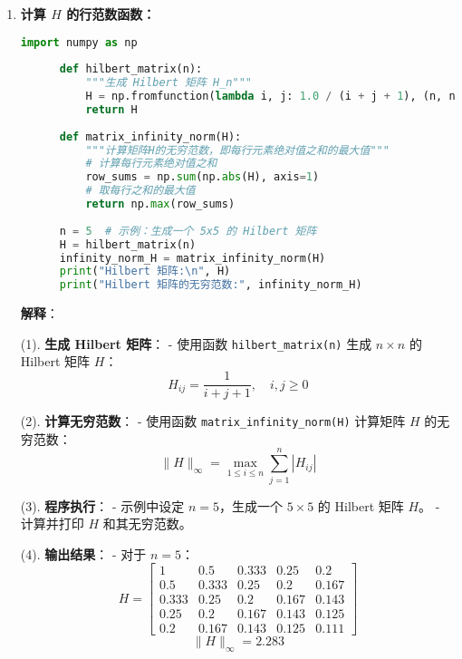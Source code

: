 \documentclass{article}
\begin{document}
\begin{enumerate}[itemsep=1em] %

      \item \textbf{计算 \( H \) 的行范数函数：}

            \begin{lstlisting}[language=Python]
      import numpy as np
      
      def hilbert_matrix(n):
          """生成 Hilbert 矩阵 H_n"""
          H = np.fromfunction(lambda i, j: 1.0 / (i + j + 1), (n, n))
          return H
      
      def matrix_infinity_norm(H):
          """计算矩阵H的无穷范数，即每行元素绝对值之和的最大值"""
          # 计算每行元素绝对值之和
          row_sums = np.sum(np.abs(H), axis=1)
          # 取每行之和的最大值
          return np.max(row_sums)
      
      n = 5  # 示例：生成一个 5x5 的 Hilbert 矩阵
      H = hilbert_matrix(n)
      infinity_norm_H = matrix_infinity_norm(H)
      print("Hilbert 矩阵:\n", H)
      print("Hilbert 矩阵的无穷范数:", infinity_norm_H)
      \end{lstlisting}

            \textbf{解释}：

            (1). \textbf{生成 Hilbert 矩阵}：
            - 使用函数 \texttt{hilbert\_matrix(n)} 生成 \( n \times n \) 的 Hilbert 矩阵 \( H \)：
            \[
                  H_{ij} = \frac{1}{i + j + 1}, \quad i, j \geq 0
            \]

            (2). \textbf{计算无穷范数}：
            - 使用函数 \texttt{matrix\_infinity\_norm(H)} 计算矩阵 \( H \) 的无穷范数：
            \[
                  \|H\|_{\infty} = \max_{1 \leq i \leq n} \sum_{j=1}^n |H_{ij}|
            \]

            (3). \textbf{程序执行}：
            - 示例中设定 \( n = 5 \)，生成一个 \( 5 \times 5 \) 的 Hilbert 矩阵 \( H \)。
            - 计算并打印 \( H \) 和其无穷范数。

            (4). \textbf{输出结果}：
            - 对于 \( n = 5 \)：
            \[
                  H = \begin{bmatrix}
                        1     & 0.5   & 0.333 & 0.25  & 0.2   \\
                        0.5   & 0.333 & 0.25  & 0.2   & 0.167 \\
                        0.333 & 0.25  & 0.2   & 0.167 & 0.143 \\
                        0.25  & 0.2   & 0.167 & 0.143 & 0.125 \\
                        0.2   & 0.167 & 0.143 & 0.125 & 0.111
                  \end{bmatrix}
            \]
            \[
                  \|H\|_{\infty} = 2.283
            \]



\end{enumerate}
\end{document}
